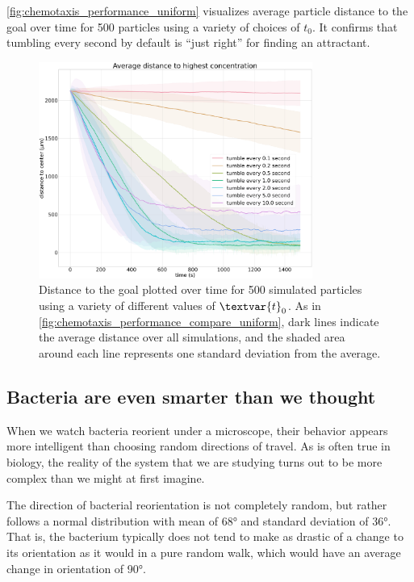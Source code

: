 \autoref{fig:chemotaxis_performance_uniform} visualizes average particle distance to the goal over time for 500 particles using a variety of choices of $t_0$. It confirms that tumbling every second by default is ``just right'' for finding an attractant.\\

\begin{figure}[h]
\centering
\mySfFamily
\includegraphics[width = 0.8\textwidth]{../images/chemotaxis_performance_uniform.png}
\caption{Distance to the goal plotted over time for 500 simulated particles using a variety of different values of $\textvar{t}_\text{0}$. As in \autoref{fig:chemotaxis_performance_compare_uniform}, dark lines indicate the average distance over all simulations, and the shaded area around each line represents one standard deviation from the average.}
\label{fig:chemotaxis_performance_uniform}
\end{figure}

\subsection{Bacteria are even smarter than we thought}

When we watch bacteria reorient under a microscope, their behavior appears more intelligent than choosing random directions of travel. As is often true in biology, the reality of the system that we are studying turns out to be more complex than we might at first imagine.

The direction of bacterial reorientation is not completely random, but rather follows a normal distribution with mean of 68° and standard deviation of 36°. That is, the bacterium typically does not tend to make as drastic of a change to its orientation as it would in a pure random walk, which would have an average change in orientation of 90°.

